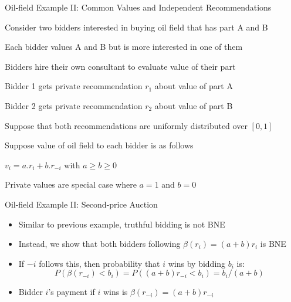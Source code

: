 \documentclass[11pt,aspectratio=169,handout]{beamer}
\begin{document}
  
  \begin{frame}{Oil-field Example II: Common Values and Independent Recommendations}
   \begin{itemizes}[0.6em]
    \item Consider two bidders interested in buying oil field that has part A and B
    \item Each bidder values A and B but is more interested in one of them
    \item Bidders hire their own consultant to evaluate value of their part
    \item Bidder 1 gets private recommendation $r_1$ about value of part A
    \item Bidder 2 gets private recommendation $r_2$ about value of part B 
    \item Suppose that both recommendations are \alert{uniformly distributed} over $[0,1]$
    \item Suppose value of oil field to each bidder is as follows
    \begin{itemizes}[0.4em]
     \item $v_i = a.r_i + b.r_{-i}$ with $a \geq b \geq 0$
     \item Private values are \alert{special case} where $a = 1$ and $b = 0$ 
    \end{itemizes}
   \end{itemizes}
  \end{frame}
  
  
  \begin{frame}{Oil-field Example II: Second-price Auction}
   \begin{itemize}[<+->]
   \setlength{\itemsep}{1.2em}
    \item Similar to previous example, \alert{truthful bidding is not BNE}
    \item Instead, we show that both bidders following $\beta(r_i) = (a + b) r_i$ is BNE
    \item If $-i$ follows this, then probability that $i$ wins by bidding $b_i$ is:
    $$P(\beta(r_{-i}) < b_i) = P((a + b) r_{-i} < b_i) = b_i / (a + b)$$
    \item Bidder $i$'s payment if $i$ wins is $\beta(r_{-i}) = (a + b) r_{-i}$
   \end{itemize}
  \end{frame}
  
\end{document}
